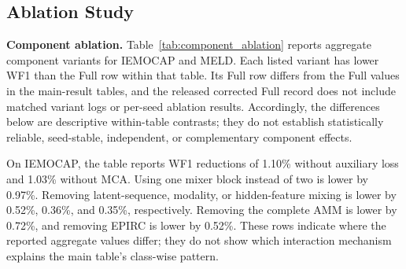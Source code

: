 \documentclass[letterpaper]{article} %
\begin{document}
\begin{table}[t]
\centering
{}
\caption{Modality ablation results on IEMOCAP and MELD. All values
are percentages.}
\label{tab:modality_ablation}
\end{table}

\subsection{Ablation Study}

\noindent\textbf{Component ablation.}
Table~\ref{tab:component_ablation} reports aggregate component variants for IEMOCAP and MELD. Each listed variant has lower WF1 than the Full row within that table. Its Full row differs from the Full values in the main-result tables, and the released corrected Full record does not include matched variant logs or per-seed ablation results. Accordingly, the differences below are descriptive within-table contrasts; they do not establish statistically reliable, seed-stable, independent, or complementary component effects.

On IEMOCAP, the table reports WF1 reductions of 1.10\% without auxiliary loss and 1.03\% without MCA. Using one mixer block instead of two is lower by 0.97\%. Removing latent-sequence, modality, or hidden-feature mixing is lower by 0.52\%, 0.36\%, and 0.35\%, respectively. Removing the complete AMM is lower by 0.72\%, and removing EPIRC is lower by 0.52\%. These rows indicate where the reported aggregate values differ; they do not show which interaction mechanism explains the main table's class-wise pattern.
\end{document}

